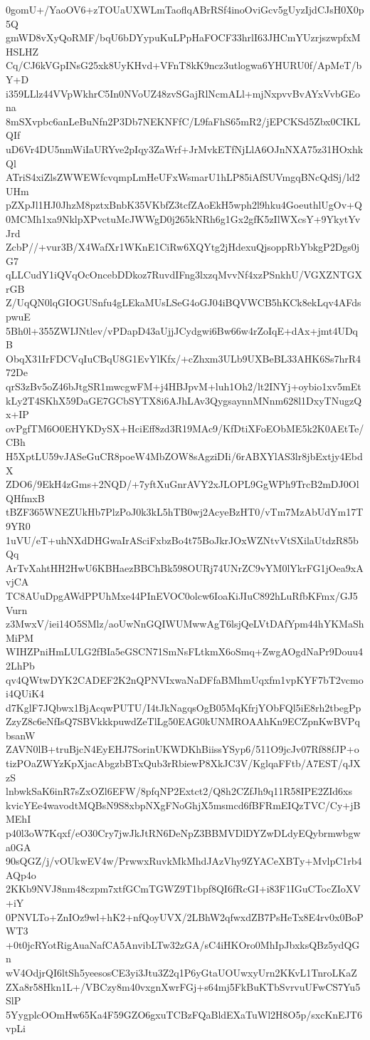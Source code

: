 0gomU+/YaoOV6+zTOUaUXWLmTaoflqABrRSf4inoOviGcv5gUyzIjdCJsH0X0p5Q
gmWD8vXyQoRMF/bqU6bDYypuKuLPpHaFOCF33hrlI63JHCmYUzrjszwpfxMHSLHZ
Cq/CJ6kVGpINsG25xk8UyKHvd+VFnT8kK9ncz3utlogwa6YHURU0f/ApMeT/bY+D
i359LLlz44VVpWkhrC5In0NVoUZ48zvSGajRlNcmALl+mjNxpvvBvAYxVvbGEona
8mSXvpbc6anLeBuNfn2P3Db7NEKNFfC/L9faFhS65mR2/jEPCKSd5Zbx0CIKLQIf
uD6Vr4DU5nmWiIaURYve2pIqy3ZaWrf+JrMvkETfNjLlA6OJnNXA75z31HOxhkQl
ATriS4xiZlsZWWEWfcvqmpLmHeUFxWsmarU1hLP85iAfSUVmgqBNcQdSj/ld2UHm
pZXpJl1HJ0JhzM8pztxBnbK35VKbfZ3tcfZAoEkH5wph2l9hku4GoeuthlUgOv+Q
0MCMh1xa9NklpXPvctuMcJWWgD0j265kNRh6g1Gx2gfK5zIlWXcsY+9YkytYvJrd
ZcbP//+vur3B/X4WafXr1WKnE1CiRw6XQYtg2jHdexuQjsoppRbYbkgP2Dgs0jG7
qLLCudY1iQVqOcOncebDDkoz7RuvdIFng3lxzqMvvNf4xzPSnkhU/VGXZNTGXrGB
Z/UqQN0lqGIOGUSnfu4gLEkaMUsLSeG4oGJ04iBQVWCB5hKCk8ekLqv4AFdspwuE
5Bh0l+355ZWIJNtlev/vPDapD43aUjjJCydgwi6Bw66w4rZoIqE+dAx+jmt4UDqB
ObqX31IrFDCVqIuCBqU8G1EvYlKfx/+cZhxm3ULb9UXBeBL33AHK6Ss7hrR472De
qrS3zBv5oZ46bJtgSR1mwcgwFM+j4HBJpvM+luh1Oh2/lt2INYj+oybio1xv5mEt
kLy2T4SKhX59DaGE7GCbSYTX8i6AJhLAv3QygsaynnMNnm628l1DxyTNugzQx+IP
ovPgfTM6O0EHYKDySX+HciEff8zd3R19MAc9/KfDtiXFoEObME5k2K0AEtTe/CBh
H5XptLU59vJASeGuCR8poeW4MbZOW8sAgziDIi/6rABXYlAS3lr8jbExtjy4EbdX
ZDO6/9EkH4zGms+2NQD/+7yftXuGnrAVY2xJLOPL9GgWPh9TrcB2mDJ0OlQHfmxB
tBZF365WNEZUkHb7PlzPoJ0k3kL5hTB0wj2AcyeBzHT0/vTm7MzAbUdYm17T9YR0
1uVU/eT+uhNXdDHGwaIrASciFxbzBo4t75BoJkrJOxWZNtvVtSXilaUtdzR85bQq
ArTvXahtHH2HwU6KBHaezBBChBk598OURj74UNrZC9vYM0lYkrFG1jOea9xAvjCA
TC8AUuDpgAWdPPUhMxe44PInEVOC0olcw6IoaKiJIuC892hLuRfbKFmx/GJ5Vurn
z3MwxV/iei14O5SMlz/aoUwNnGQIWUMwwAgT6lsjQeLVtDAfYpm44hYKMaShMiPM
WIHZPniHmLULG2fBIa5eGSCN71SmNsFLtkmX6oSmq+ZwgAOgdNaPr9Douu42LhPb
qv4QWtwDYK2CADEF2K2nQPNVIxwaNaDFfaBMhmUqxfm1vpKYF7bT2vcmoi4QUiK4
d7KglF7JQbwx1BjAcqwPUTU/I4tJkNagqsOgB05MqKfrjYObFQl5iE8rh2tbegPp
ZzyZ8c6eNfIsQ7SBVkkkpuwdZeTlLg50EAG0kUNMROAAhKn9ECZpnKwBVPqbsanW
ZAVN0lB+truBjcN4EyEHJ7SorinUKWDKhBiissYSyp6/511O9jcJv07Rf88fJP+o
tizPOaZWYzKpXjacAbgzbBTxQub3rRbiewP8XkJC3V/KglqaFFtb/A7EST/qJXzS
lnbwkSaK6inR7sZxOZl6EFW/8pfqNP2Extct2/Q8h2CZfJh9q11R58IPE2ZId6xs
kvicYEe4wavodtMQBsN9S8xbpNXgFNoGhjX5msmcd6fBFRmEIQzTVC/Cy+jBMEhI
p40l3oW7Kqxf/eO30Cry7jwJkJtRN6DeNpZ3BBMVDlDYZwDLdyEQybrmwbgwa0GA
90sQGZ/j/vOUkwEV4w/PrwwxRuvkMkMhdJAzVhy9ZYACeXBTy+MvlpC1rb4AQp4o
2KKb9NVJ8nm48czpm7xtfGCmTGWZ9T1bpf8QI6fRcGI+i83F1IGuCTocZIoXV+iY
0PNVLTo+ZnIOz9wl+hK2+nfQoyUVX/2LBhW2qfwxdZB7PsHeTx8E4rv0x0BoPWT3
+0t0jcRYotRigAuaNafCA5AnvibLTw32zGA/sC4iHKOro0MhIpJbxksQBz5ydQGn
wV4OdjrQI6ltSh5yeesosCE3yi3Jtu3Z2q1P6yGtaUOUwxyUrn2KKvL1TnroLKaZ
ZXa8r58Hkn1L+/VBCzy8m40vxgnXwrFGj+s64mj5FkBuKTbSvrvuUFwCS7Yu5SlP
5YygplcOOmHw65Ka4F59GZO6gxuTCBzFQaBldEXaTuWl2H8O5p/sxcKnEJT6vpLi
